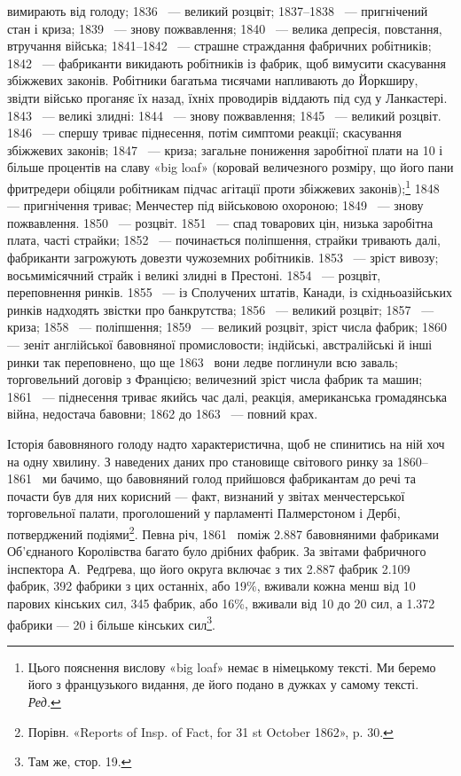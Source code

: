 \parcont{}  %
вимирають від голоду; 1836~ — великий розцвіт; 1837--1838~ —
пригнічений стан і криза; 1839~ — знову пожвавлення; 1840~ —
велика депресія, повстання, втручання війська; 1841--1842~ —
страшне страждання фабричних робітників; 1842~ — фабриканти
викидають робітників із фабрик, щоб вимусити скасування збіжжевих
законів. Робітники багатьма тисячами напливають до
Йоркширу, звідти військо проганяє їх назад, їхніх проводирів
віддають під суд у Ланкастері. 1843~ — великі злидні: 1844~ —
знову пожвавлення; 1845~ — великий розцвіт. 1846~ — спершу
триває піднесення, потім симптоми реакції; скасування збіжжевих
законів; 1847~ — криза; загальне пониження заробітної плати
на 10 і більше процентів на славу «big loaf» (коровай величезного
розміру, що його пани фритредери обіцяли робітникам підчас
агітації проти збіжжевих законів);\footnote*{
Цього пояснення вислову «big loaf» немає в німецькому тексті.
Ми беремо його з французького видання, де його подано в дужках у самому
тексті. \emph{Ред.}
} 1848~ — пригнічення триває; Менчестер під військовою охороною; 1849~ —
знову пожвавлення. 1850~ — розцвіт. 1851~ — спад товарових цін, низька
заробітна плата, часті страйки; 1852~ — починається поліпшення,
страйки тривають далі, фабриканти загрожують довезти чужоземних
робітників. 1853~ — зріст вивозу; восьмимісячний страйк
і великі злидні в Престоні. 1854~ — розцвіт, переповнення ринків.
1855~ — із Сполучених штатів, Канади, із східньоазійських
ринків надходять звістки про банкрутства; 1856~ — великий
розцвіт; 1857~ — криза; 1858~ — поліпшення; 1859~ — великий
розцвіт, зріст числа фабрик; 1860~ — зеніт англійської
бавовняної промисловости; індійські, австралійські й інші ринки
так переповнено, що ще 1863~ вони ледве поглинули всю заваль;
торговельний договір з Францією; величезний зріст числа фабрик
та машин; 1861~ — піднесення триває якийсь час далі, реакція,
американська громадянська війна, недостача бавовни; 1862 до
1863~ — повний крах.
\enablefootnotebreak{}

Історія бавовняного голоду надто характеристична, щоб не
спинитись на ній хоч на одну хвилину. З наведених даних про
становище світового ринку за 1860--1861~ ми бачимо, що
бавовняний голод прийшовся фабрикантам до речі та почасти був
для них корисний — факт, визнаний у звітах менчестерської
торговельної палати, проголошений у парламенті Палмерстоном
і Дербі, потверджений подіями\footnote{
Порівн. «Reports of Insp. of Fact, for 31 st October 1862», p. 30.
}. Певна річ, 1861~
поміж \num{2.887} бавовняними фабриками Об’єднаного Королівства
багато було дрібних фабрик. За звітами фабричного інспектора
А.~Редґрева, що його округа включає з тих \num{2.887} фабрик \num{2.109} фабрик,
392 фабрики з цих останніх, або 19\%, вживали кожна
менш від 10 парових кінських сил, 345 фабрик, або 16\%, вживали
від 10 до 20 сил, а \num{1.372} фабрики — 20 і більше кінських сил\footnote{
Там же, стор. 19.
}.
\parbreak{}  %
